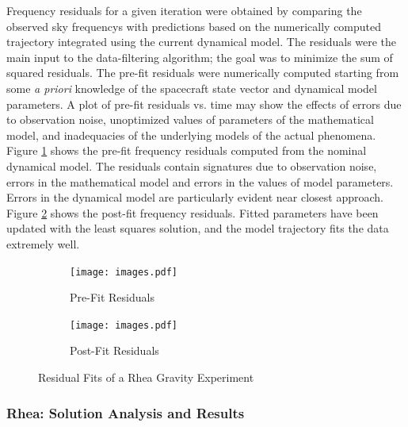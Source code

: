 \documentclass{article}
\theoremstyle{mystyle}
\begin{document}
Frequency residuals for a given iteration were obtained by comparing the observed \glspl{sky frequency} with predictions based on the numerically computed trajectory integrated using the current dynamical model. The residuals were the main input to the data-filtering algorithm; the goal was to minimize the sum of squared residuals. The pre-fit residuals were numerically computed starting from some \textit{a priori} knowledge of the spacecraft state vector and dynamical model parameters. A plot of pre-fit residuals vs. time may show the effects of errors due to observation noise, unoptimized values of parameters of the mathematical model, and inadequacies of the underlying models of the actual phenomena.
Figure \ref{fig:usr_pre_fit_rhea_grav_exp} shows the pre-fit frequency residuals computed from the nominal dynamical model. The residuals contain signatures due to observation noise, errors in the mathematical model and errors in the values of model parameters. Errors in the dynamical model are particularly evident near closest approach. Figure \ref{fig:usr_post_fit_rhea_grav_exp} shows the post-fit frequency residuals. Fitted parameters have been updated with the least squares solution, and the model trajectory fits the  data extremely well.

\begin{figure}[H]
	\centering
	\begin{subfigure}[b]{0.48\textwidth}
	    \texttt{[image: images.pdf]}
	    \caption{\scriptsize Pre-Fit Residuals}
	    \label{fig:usr_pre_fit_rhea_grav_exp}
    \end{subfigure}
    \begin{subfigure}[b]{0.5\textwidth}
        \texttt{[image: images.pdf]}
        \caption{\scriptsize Post-Fit Residuals}
        \label{fig:usr_post_fit_rhea_grav_exp}
    \end{subfigure}
        \caption{Residual Fits of a Rhea Gravity Experiment}
        \label{fig:usr_rhea_grav_exp}
\end{figure}

\subsubsection{\footnotesize Rhea: Solution Analysis and Results}
\end{document}
